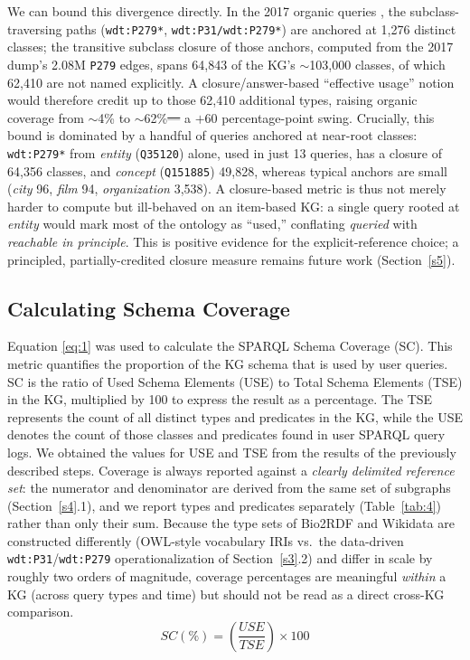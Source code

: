 \documentclass[sw]{iosart2x}
\providecommand{\DIFadd}[1]{{\protect\color{blue}\uwave{#1}}} %
\providecommand{\DIFdel}[1]{{\protect\color{red}\sout{#1}}} %
\providecommand{\DIFaddbegin}{} %
\providecommand{\DIFaddend}{} %
\providecommand{\DIFdelbegin}{} %
\providecommand{\DIFdelend}{} %
\providecommand{\DIFscaledelfig}{0.5}
\newlength{\DIFdelgraphicswidth} %
\newlength{\DIFdelgraphicsheight} %
\providecommand{\DIFaddincludegraphics}[2][]{{\color{blue}\fbox{\DIFOincludegraphics[#1]{#2}}}} %
\providecommand{\DIFdelincludegraphics}[2][]{%
\sbox{\DIFdelgraphicsbox}{\DIFOincludegraphics[#1]{#2}}%
\settoboxwidth{\DIFdelgraphicswidth}{\DIFdelgraphicsbox} %
\settoboxtotalheight{\DIFdelgraphicsheight}{\DIFdelgraphicsbox} %
\scalebox{\DIFscaledelfig}{%
\parbox[b]{\DIFdelgraphicswidth}{\usebox{\DIFdelgraphicsbox}\\[-\baselineskip] \rule{\DIFdelgraphicswidth}{0em}}\llap{\resizebox{\DIFdelgraphicswidth}{\DIFdelgraphicsheight}{%
\setlength{\unitlength}{\DIFdelgraphicswidth}%
\begin{picture}(1,1)%
\thicklines\linethickness{2pt} %
{\color[rgb]{1,0,0}\put(0,0){\framebox(1,1){}}}%
{\color[rgb]{1,0,0}\put(0,0){\line( 1,1){1}}}%
{\color[rgb]{1,0,0}\put(0,1){\line(1,-1){1}}}%
\end{picture}%
}\hspace*{3pt}}} %
} %
\DeclareRobustCommand{\DIFaddbegin}{\DIFOaddbegin \let\includegraphics\DIFaddincludegraphics} %
\DeclareRobustCommand{\DIFaddend}{\DIFOaddend \let\includegraphics\DIFOincludegraphics} %
\DeclareRobustCommand{\DIFdelbegin}{\DIFOdelbegin \let\includegraphics\DIFdelincludegraphics} %
\DeclareRobustCommand{\DIFdelend}{\DIFOaddend \let\includegraphics\DIFOincludegraphics} %
\begin{document}
We can bound this divergence directly. In the 2017 organic queries \DIFaddbegin \DIFadd{of Wikidata}\DIFaddend , the subclass-traversing paths (\texttt{wdt:P279*}, \texttt{wdt:P31/wdt:P279*}) are anchored at 1,276 distinct classes; the transitive subclass closure of those anchors, computed from the 2017 dump's 2.08M \texttt{P279} edges, spans 64,843 of the KG's $\sim$103,000 classes, of which 62,410 are not named explicitly. A closure/answer-based ``effective usage'' notion would therefore credit up to those 62,410 additional types, raising organic coverage from $\sim$4\% to $\sim$62\%\DIFdelbegin \DIFdel{--- }\DIFdelend \DIFaddbegin \DIFadd{, }\DIFaddend a $+60$ percentage-point swing. Crucially, this bound is dominated by a handful of queries anchored at near-root classes: \texttt{wdt:P279*} from \emph{entity} (\texttt{Q35120}) alone, used in just 13 queries, has a closure of 64,356 classes, and \emph{concept} (\texttt{Q151885}) 49,828, whereas typical anchors are small (\emph{city} 96, \emph{film} 94, \emph{organization} 3,538). A closure-based metric is thus not merely harder to compute but ill-behaved on an item-based KG: a single query rooted at \emph{entity} would mark most of the ontology as ``used,'' conflating \emph{queried} with \emph{reachable in principle}. This is positive evidence for the explicit-reference choice; a principled, partially-credited closure measure remains future work (Section~\ref{s5}).

\subsection{Calculating Schema Coverage}
Equation \ref{eq:1} was used to calculate the SPARQL Schema Coverage (SC). This metric quantifies the proportion of the KG schema that is used by user queries. SC is the ratio of Used Schema Elements (USE) to Total Schema Elements (TSE) in the KG, multiplied by 100 to express the result as a percentage. The TSE represents the count of all distinct types and predicates in the KG, while the USE denotes the count of those classes and predicates found in user SPARQL query logs. We obtained the values for USE and TSE from the results of the previously described steps. Coverage is always reported against a \emph{clearly delimited reference set}: the numerator and denominator are derived from the same set of subgraphs (Section~\ref{s4}.1), and we report types and predicates separately (Table~\ref{tab:4}) rather than only their sum. Because the type sets of Bio2RDF and Wikidata are constructed differently (OWL-style vocabulary IRIs vs.\ the data-driven \texttt{wdt:P31}/\texttt{wdt:P279} operationalization of Section~\ref{s3}.2) and differ in scale by roughly two orders of magnitude, coverage percentages are meaningful \emph{within} a KG (across query types and time) but should not be read as a direct cross-KG comparison.
\begin{equation}
SC (\%) = \left( \frac{USE}{TSE} \right) \times 100
\label{eq:1}
\end{equation}
\end{document}
